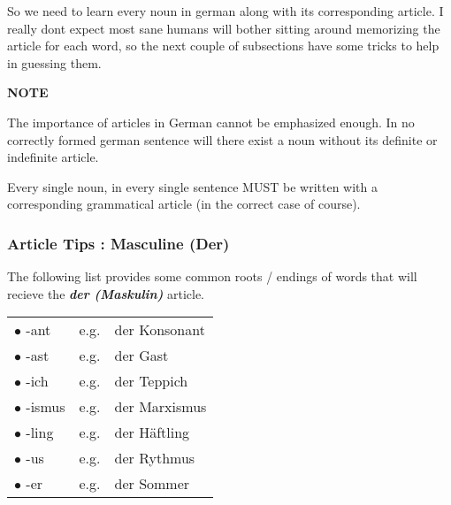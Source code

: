 \documentclass[a4paper,twocolumn,10pt]{article}
\newcommand{\newpar}
{\par \vspace{0.3cm}}
\begin{document}
So we need to learn every noun in german along with its corresponding article. I
really dont expect most sane humans will bother sitting around memorizing the
article for each word, so the next couple of subsections have some tricks to
help in guessing them.


\nolinenumbers
\vspace{0.2cm}
\centering
\begin{note-bg}

	\begin{note-theword}
		{\footnotesize \textbf{NOTE} }
	\end{note-theword}

	\begin{note-content}
		\justifying
		The importance of articles in German cannot be emphasized enough. In no
		correctly formed german sentence will there exist a noun without its
		definite or indefinite article.\newpar

		Every single noun, in every single sentence MUST be written with a
		corresponding grammatical article (in the correct case of course).
	\end{note-content}

\end{note-bg}
\linenumbers
\justifying


\subsubsection{Article Tips : Masculine (Der)}
\label{sssec:article_tips_masculine_der_}

The following list provides some common roots / endings of words that will
recieve the \textbf{\textit{der (Maskulin)}} article.


\nolinenumbers

\vspace{0.2cm}

\begin{tabular}{l r l}

\rowcolor{white} $\bullet$ -ant   & e.g. & der Konsonant\\
\rowcolor{white} $\bullet$ -ast   & e.g. & der Gast     \\
\rowcolor{white} $\bullet$ -ich   & e.g. & der Teppich  \\
\rowcolor{white} $\bullet$ -ismus & e.g. & der Marxismus\\
\rowcolor{white} $\bullet$ -ling  & e.g. & der Häftling \\
\rowcolor{white} $\bullet$ -us    & e.g. & der Rythmus  \\
\rowcolor{white} $\bullet$ -er    & e.g. & der Sommer   \\

\end{tabular}
\end{document}
